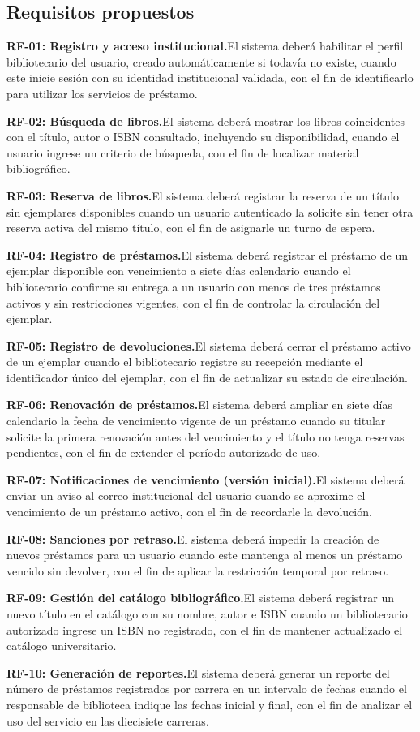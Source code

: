 \documentclass[conference,onecolumn]{IEEEtran}
\newcommand{\req}[1]{\par\noindent\textbf{#1.}\hspace{0.5em}}
\begin{document}
\subsection{Requisitos propuestos}
\req{RF-01: Registro y acceso institucional}El sistema deberá habilitar el perfil bibliotecario del usuario, creado automáticamente si todavía no existe, cuando este inicie sesión con su identidad institucional validada, con el fin de identificarlo para utilizar los servicios de préstamo.
\req{RF-02: Búsqueda de libros}El sistema deberá mostrar los libros coincidentes con el título, autor o ISBN consultado, incluyendo su disponibilidad, cuando el usuario ingrese un criterio de búsqueda, con el fin de localizar material bibliográfico.
\req{RF-03: Reserva de libros}El sistema deberá registrar la reserva de un título sin ejemplares disponibles cuando un usuario autenticado la solicite sin tener otra reserva activa del mismo título, con el fin de asignarle un turno de espera.
\req{RF-04: Registro de préstamos}El sistema deberá registrar el préstamo de un ejemplar disponible con vencimiento a siete días calendario cuando el bibliotecario confirme su entrega a un usuario con menos de tres préstamos activos y sin restricciones vigentes, con el fin de controlar la circulación del ejemplar.
\req{RF-05: Registro de devoluciones}El sistema deberá cerrar el préstamo activo de un ejemplar cuando el bibliotecario registre su recepción mediante el identificador único del ejemplar, con el fin de actualizar su estado de circulación.
\req{RF-06: Renovación de préstamos}El sistema deberá ampliar en siete días calendario la fecha de vencimiento vigente de un préstamo cuando su titular solicite la primera renovación antes del vencimiento y el título no tenga reservas pendientes, con el fin de extender el período autorizado de uso.
\req{RF-07: Notificaciones de vencimiento (versión inicial)}El sistema deberá enviar un aviso al correo institucional del usuario cuando se aproxime el vencimiento de un préstamo activo, con el fin de recordarle la devolución.
\req{RF-08: Sanciones por retraso}El sistema deberá impedir la creación de nuevos préstamos para un usuario cuando este mantenga al menos un préstamo vencido sin devolver, con el fin de aplicar la restricción temporal por retraso.
\req{RF-09: Gestión del catálogo bibliográfico}El sistema deberá registrar un nuevo título en el catálogo con su nombre, autor e ISBN cuando un bibliotecario autorizado ingrese un ISBN no registrado, con el fin de mantener actualizado el catálogo universitario.
\req{RF-10: Generación de reportes}El sistema deberá generar un reporte del número de préstamos registrados por carrera en un intervalo de fechas cuando el responsable de biblioteca indique las fechas inicial y final, con el fin de analizar el uso del servicio en las diecisiete carreras.
\end{document}
